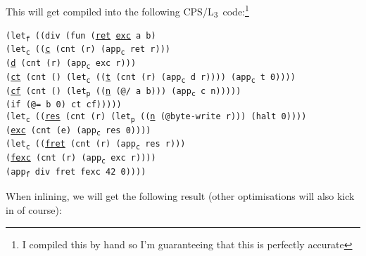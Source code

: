 \documentclass[12pt,a4paper]{article}
\newcommand{\lang}{L\textsubscript{3}~}
\newcommand{\cps}[3]{\texttt{\textcolor{BurntOrange}{#1}#2\textcolor{BurntOrange}{#3}}}
\newcommand{\ts}[2]{#1\textsubscript{#2}}
\newcommand{\letp}{\ts{let}{p}}
\newcommand{\letc}{\ts{let}{c}}
\newcommand{\letf}{\ts{let}{f}}
\newcommand{\appc}{\ts{app}{c}}
\newcommand{\appf}{\ts{app}{f}}
\begin{document}
This will get compiled into the following CPS/\lang code:\footnote{I compiled this by hand so I'm guaranteeing that this is perfectly accurate}

\cps{(\letf~}{\cps{(}{(div \cps{(fun }{(\underline{ret} \underline{exc} a b)\\
\hspace*{8em}\cps{(\letc~}{\cps{(}{(\underline{c} \cps{(cnt }{(r) \cps{(\appc~}{ret r}{)}}{)})\\
\hspace*{11.4em}(\underline{d} \cps{(cnt }{(r) \cps{(\appc~}{exc r}{)}}{)})\\
\hspace*{11.4em}(\underline{ct} \cps{(cnt }{() \cps{(\letc~}{\cps{(}{(\underline{t} \cps{(cnt }{(r) \cps{(\appc~}{d r}{)}}{)})}{)} \cps{(\appc~}{t 0}{)}}{)}}{)})\\
\hspace*{11.4em}(\underline{cf} \cps{(cnt }{() \cps{(\letp~}{\cps{(}{(\underline{n} \cps{(@}{/ a b}{)})}{)} \cps{(\appc~}{c n}{)}}{)}}{)})}{)}\\
\hspace*{10em}\cps{(if (@}{= b 0}{) ct cf)}}{)}}{)})}{)}\\
\hspace*{3em}\cps{(\letc~}{\cps{(}{(\underline{res} \cps{(cnt }{(r) \cps{(\letp~}{\cps{(}{(\underline{n} \cps{(@}{byte-write r}{)})}{)} \cps{(halt }{0}{)}}{)}}{)})\\
\hspace*{6.4em}(\underline{exc} \cps{(cnt }{(e) \cps{(\appc~}{res 0}{)}}{)})}{)}\\
\hspace*{5em}\cps{(\letc~}{\cps{(}{(\underline{fret} \cps{(cnt }{(r) \cps{(\appc~}{res r}{)}}{)})\\
\hspace*{8.4em}(\underline{fexc} \cps{(cnt }{(r) \cps{(\appc~}{exc r}{)}}{)})}{)}\\
\hspace*{7em}\cps{(\appf~}{div fret fexc 42 0}{)}}{)}}{)}}{)}

When inlining, we will get the following result (other optimisations will also kick in of course):
\end{document}
